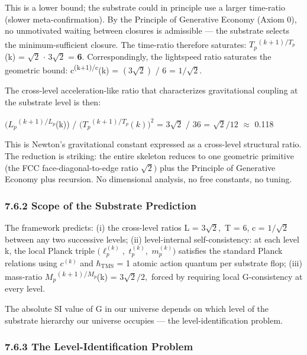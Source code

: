 \documentclass[11pt,oneside]{report}
\theoremstyle{definition}
\theoremstyle{remark}
\begin{document}
This is a lower bound; the substrate could in principle use a larger
time-ratio (slower meta-confirmation). By the Principle of Generative
Economy (Axiom 0), no unmotivated waiting between closures is admissible
--- the substrate selects the minimum-sufficient closure. The time-ratio
therefore saturates: \ensuremath{T_{p}}\textsuperscript{\ensuremath{(k+1)/T_{p}}}(k) = \ensuremath{\sqrt{2}} \ensuremath{\cdot} \ensuremath{3\sqrt{2}} =
\textbf{6}. Correspondingly, the lightspeed ratio saturates the
geometric bound: c\textsuperscript{(k+1)/c}(k) = \ensuremath{(3\sqrt{2})} / 6 =
\textbf{\ensuremath{1/\sqrt{2}}}.

The cross-level acceleration-like ratio that characterizes gravitational
coupling at the substrate level is then:

\ensuremath{(L_{p}}\textsuperscript{\ensuremath{(k+1)/L_{p}}}(k)) /
\ensuremath{(T_{p}}\textsuperscript{\ensuremath{(k+1)/T_{p}}}\ensuremath{(k))^{2}} = \ensuremath{3\sqrt{2}} / 36 = \ensuremath{\sqrt{2}/12} \ensuremath{\approx} 0.118

This is Newton's gravitational constant expressed as a cross-level
structural ratio. The reduction is striking: the entire skeleton reduces
to one geometric primitive (the FCC face-diagonal-to-edge ratio \ensuremath{\sqrt{2})} plus
the Principle of Generative Economy plus recursion. No dimensional
analysis, no free constants, no tuning.

\subsubsection*{7.6.2 Scope of the Substrate Prediction}

The framework predicts: (i) the cross-level ratios L = \ensuremath{3\sqrt{2},} T = 6, c =
\ensuremath{1/\sqrt{2}} between any two successive levels; (ii) level-internal
self-consistency: at each level k, the local Planck triple \ensuremath{(\ell_{p}^{(k)},}
\ensuremath{t_{p}^{(k)},} \ensuremath{m_{p}^{(k)})} satisfies the standard Planck relations using
\ensuremath{c^{(k)}} and \ensuremath{\hbar_{\mathrm{TMS}}} = 1 atomic action quantum per substrate flop; (iii)
mass-ratio \ensuremath{M_{p}}\textsuperscript{\ensuremath{(k+1)/M_{p}}}(k) = \ensuremath{3\sqrt{2}/2,} forced by
requiring local G-consistency at every level.

The absolute SI value of G in our universe depends on which level of the
substrate hierarchy our universe occupies --- the level-identification
problem.

\subsubsection*{7.6.3 The Level-Identification Problem}
\end{document}
